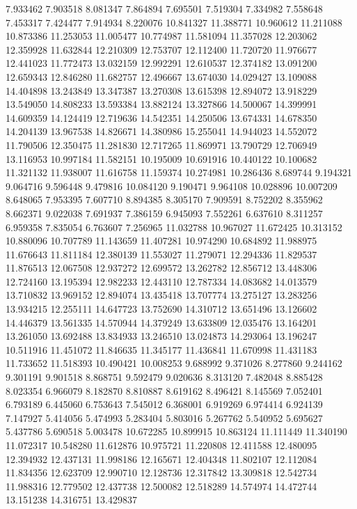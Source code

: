 7.933462
7.903518
8.081347
7.864894
7.695501
7.519304
7.334982
7.558648
7.453317
7.424477
7.914934
8.220076
10.841327
11.388771
10.960612
11.211088
10.873386
11.253053
11.005477
10.774987
11.581094
11.357028
12.203062
12.359928
11.632844
12.210309
12.753707
12.112400
11.720720
11.976677
12.441023
11.772473
13.032159
12.992291
12.610537
12.374182
13.091200
12.659343
12.846280
11.682757
12.496667
13.674030
14.029427
13.109088
14.404898
13.243849
13.347387
13.270308
13.615398
12.894072
13.918229
13.549050
14.808233
13.593384
13.882124
13.327866
14.500067
14.399991
14.609359
14.124419
12.719636
14.542351
14.250506
13.674331
14.678350
14.204139
13.967538
14.826671
14.380986
15.255041
14.944023
14.552072
11.790506
12.350475
11.281830
12.717265
11.869971
13.790729
12.706949
13.116953
10.997184
11.582151
10.195009
10.691916
10.440122
10.100682
11.321132
11.938007
11.616758
11.159374
10.274981
10.286436
8.689744
9.194321
9.064716
9.596448
9.479816
10.084120
9.190471
9.964108
10.028896
10.007209
8.648065
7.953395
7.607710
8.894385
8.305170
7.909591
8.752202
8.355962
8.662371
9.022038
7.691937
7.386159
6.945093
7.552261
6.637610
8.311257
6.959358
7.835054
6.763607
7.256965
11.032788
10.967027
11.672425
10.313152
10.880096
10.707789
11.143659
11.407281
10.974290
10.684892
11.988975
11.676643
11.811184
12.380139
11.553027
11.279071
12.294336
11.829537
11.876513
12.067508
12.937272
12.699572
13.262782
12.856712
13.448306
12.724160
13.195394
12.982233
12.443110
12.787334
14.083682
14.013579
13.710832
13.969152
12.894074
13.435418
13.707774
13.275127
13.283256
13.934215
12.255111
14.647723
13.752690
14.310712
13.651496
13.126602
14.446379
13.561335
14.570944
14.379249
13.633809
12.035476
13.164201
13.261050
13.692488
13.834933
13.246510
13.024873
14.293064
13.196247
10.511916
11.451072
11.846635
11.345177
11.436841
11.670998
11.431183
11.733652
11.518393
10.490421
10.008253
9.688992
9.371026
8.277860
9.244162
9.301191
9.901518
8.868751
9.592479
9.020636
8.313120
7.482048
8.885428
8.023354
6.966079
8.182870
8.810887
8.619162
8.496421
8.145569
7.052401
6.793189
6.445060
6.753643
7.545012
6.368001
6.919269
6.974414
6.924139
7.147927
5.414056
5.474993
5.283404
5.803016
5.267762
5.540952
5.695627
5.437786
5.690518
5.003478
10.672285
10.899915
10.863124
11.111449
11.340190
11.072317
10.548280
11.612876
10.975721
11.220808
12.411588
12.480095
12.394932
12.437131
11.998186
12.165671
12.404348
11.802107
12.112084
11.834356
12.623709
12.990710
12.128736
12.317842
13.309818
12.542734
11.988316
12.779502
12.437738
12.500082
12.518289
14.574974
14.472744
13.151238
14.316751
13.429837
